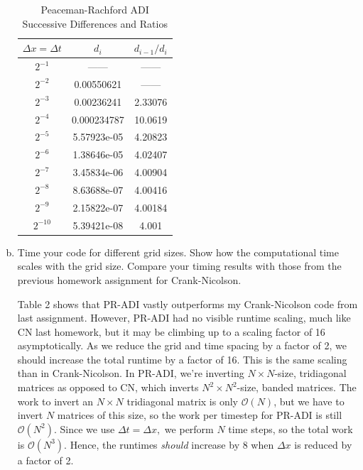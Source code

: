 \documentclass[12pt]{article}
\begin{document}
\begin{enumerate}[(a)]
\begin{table}[H]
\caption{Peaceman-Rachford ADI Successive Differences and Ratios}
\centering\begin{tabular}{||c|cc||}
\hline \hline
   $\Delta x = \Delta t$ &  $d_i$ &   $d_{i-1}/d_{i}$ \\
\hline \hline
                $2^{-1}$      &            ------       &        ------   \\
                $2^{-2}$    &              0.00550621  &       ------   \\
                $2^{-3}$    &      0.00236241  &             2.33076  \\
                $2^{-4}$     &         0.000234787 &            10.0619\\
                $2^{-5}$      &       5.57923e-05 &             4.20823 \\
                $2^{-6}$       &       1.38646e-05 &             4.02407  \\
                $2^{-7}$        &      3.45834e-06 &             4.00904  \\
                $2^{-8}$         &    8.63688e-07 &             4.00416 \\
                $2^{-9}$          &    2.15822e-07 &             4.00184 \\
                $2^{-10}$          &     5.39421e-08 &             4.001 \\
\hline \hline
\end{tabular}
\end{table}


\item Time your code for different grid sizes. Show how the computational time scales with the grid size. Compare your timing results with those from the previous homework assignment for Crank-Nicolson.

Table 2 shows that PR-ADI vastly outperforms my Crank-Nicolson code from last assignment.  However, PR-ADI had no visible runtime scaling, much like CN last homework, but it may be climbing up to a scaling factor of 16 asymptotically.  As we reduce the grid and time spacing by a factor of 2, we should increase the total runtime by a factor of 16.  This is the same scaling than in Crank-Nicolson.  In PR-ADI, we're inverting $N\times N$-size, tridiagonal matrices as opposed to CN, which inverts $N^2\times N^2$-size, banded matrices.  The work to invert an $N\times N$ tridiagonal matrix is only $\mathcal{O}(N)$, but we have to invert $N$ matrices of this size, so the work per timestep for PR-ADI is still $\mathcal{O}(N^2)$.  Since we use $\Delta t = \Delta x,$ we perform $N$ time steps, so the total work is $\mathcal{O}(N^3)$.  Hence, the runtimes \emph{should} increase by 8 when $\Delta x$ is reduced by a factor of 2.


\end{enumerate}
\end{document}

